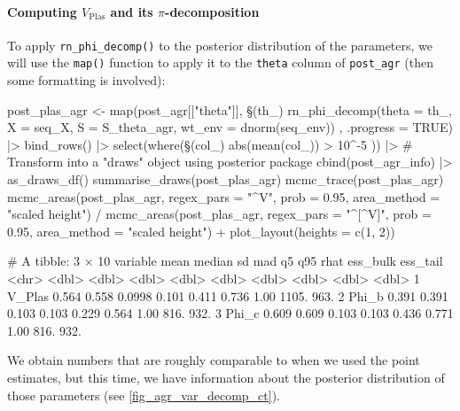\documentclass[a4paper,12pt,twoside]{article}
\begin{document}
\paragraph{Computing $V_{\text{Plas}}$ and its $\pi$-decomposition}
To apply \texttt{rn\_phi\_decomp()} to the posterior distribution of the parameters, we will use the \texttt{map()} function to apply it to the \texttt{theta} column of \texttt{post\_agr} (then some formatting is involved):
\begin{Rinput}
post_plas_agr <-
    map(post_agr[["theta"]],
        \§§(th_) { rn_phi_decomp(theta  = th_,
                      X      = seq_X,
                      S      = S_theta_agr,
                      wt_env = dnorm(seq_env)) },
        .progress = TRUE) |>
    bind_rows()  |>
    select(where(\§§(col_) { abs(mean(col_)) > 10^-5 })) |>
    # Transform into a "draws" object using posterior package
    cbind(post_agr_info) |>
    as_draws_df()
summarise_draws(post_plas_agr)
mcmc_trace(post_plas_agr)
mcmc_areas(post_plas_agr,
           regex_pars = "^V",
           prob = 0.95,
           area_method = "scaled height") /
    mcmc_areas(post_plas_agr,
               regex_pars = "^[^V]",
               prob = 0.95,
               area_method = "scaled height") +
    plot_layout(heights = c(1, 2))
\end{Rinput}
\begin{Routput}
# A tibble: 3 × 10
  variable  mean median     sd   mad    q5   q95  rhat ess_bulk ess_tail
  <chr>    <dbl>  <dbl>  <dbl> <dbl> <dbl> <dbl> <dbl>    <dbl>    <dbl>
1 V_Plas   0.564  0.558 0.0998 0.101 0.411 0.736  1.00    1105.     963.
2 Phi_b    0.391  0.391 0.103  0.103 0.229 0.564  1.00     816.     932.
3 Phi_c    0.609  0.609 0.103  0.103 0.436 0.771  1.00     816.     932.
\end{Routput}
We obtain numbers that are roughly comparable to when we used the point estimates, but this time, we have information about the posterior distribution of those parameters (see \autoref{fig_agr_var_decomp_ct}).
\end{document}
